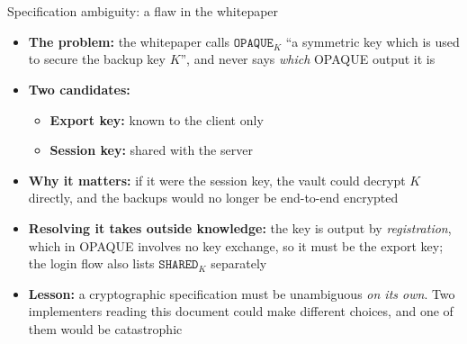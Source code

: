 \ifdefined\PRESENTATION\else\PassOptionsToClass{handout}{beamer}\fi\documentclass[aspectratio=169, lualatex]{beamer}
\begin{document}
\begin{frame}{Specification ambiguity: a flaw in the whitepaper}
	\begin{itemize}
		\item \textbf{The problem:} the whitepaper calls $\mathtt{OPAQUE}_K$ ``a symmetric key which is used to secure the backup key $K$'', and never says \textit{which} OPAQUE output it is
		\item \textbf{Two candidates:}
		      \begin{itemize}
			      \item \textbf{Export key:} known to the client only
			      \item \textbf{Session key:} shared with the server
		      \end{itemize}
		\item \textbf{Why it matters:} if it were the session key, the vault could decrypt $K$ directly, and the backups would no longer be end-to-end encrypted
		\item \textbf{Resolving it takes outside knowledge:} the key is output by \textit{registration}, which in OPAQUE involves no key exchange, so it must be the export key; the login flow also lists $\mathtt{SHARED}_K$ separately
		\item \textbf{Lesson:} a cryptographic specification must be unambiguous \textit{on its own}. Two implementers reading this document could make different choices, and one of them would be catastrophic
	\end{itemize}
\end{frame}
\end{document}

